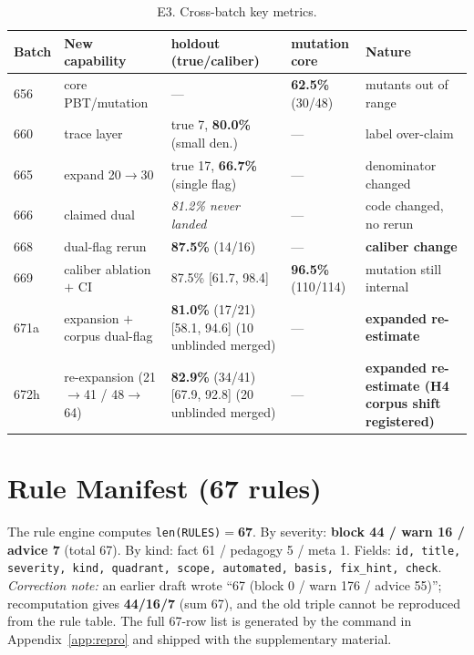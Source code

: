 \documentclass{article}
\begin{document}
\begin{table}[t]
\caption{E3. Cross-batch key metrics.}
\label{tab:e3}
\centering
\small
\begin{tabular}{@{}llp{3.0cm}lp{3.0cm}@{}}
\toprule
Batch & New capability & holdout (true/caliber) & mutation core & Nature \\
\midrule
656 & core PBT/mutation & --- & \textbf{62.5\%} (30/48) & mutants out of range \\
660 & trace layer & true 7, \textbf{80.0\%} (small den.) & --- & label over-claim \\
665 & expand 20$\to$30 & true 17, \textbf{66.7\%} (single flag) & --- & denominator changed \\
666 & claimed dual & \textit{81.2\% never landed} & --- & code changed, no rerun \\
668 & dual-flag rerun & \textbf{87.5\%} (14/16) & --- & \textbf{caliber change} \\
669 & caliber ablation $+$ CI & 87.5\% [61.7, 98.4] & \textbf{96.5\%} (110/114) & mutation still internal \\
671a & expansion $+$ corpus dual-flag & \textbf{81.0\%} (17/21) [58.1, 94.6] (10 unblinded merged) & --- & \textbf{expanded re-estimate} \\
672h & re-expansion (21$\to$41 / 48$\to$64) & \textbf{82.9\%} (34/41) [67.9, 92.8] (20 unblinded merged) & --- & \textbf{expanded re-estimate (H4 corpus shift registered)} \\
\bottomrule
\end{tabular}
\end{table}

\section{Rule Manifest (67 rules)}
\label{app:rules}
The rule engine computes \texttt{len(RULES)}$=$\textbf{67}. By severity: \textbf{block 44 / warn 16
/ advice 7} (total 67). By kind: fact 61 / pedagogy 5 / meta 1. Fields:
\texttt{id, title, severity, kind, quadrant, scope, automated, basis, fix\_hint, check}.
\emph{Correction note:} an earlier draft wrote ``67 (block 0 / warn 176 / advice 55)''; recomputation
gives \textbf{44/16/7} (sum 67), and the old triple cannot be reproduced from the rule table. The
full 67-row list is generated by the command in Appendix~\ref{app:repro} and shipped with the
supplementary material.
\end{document}
